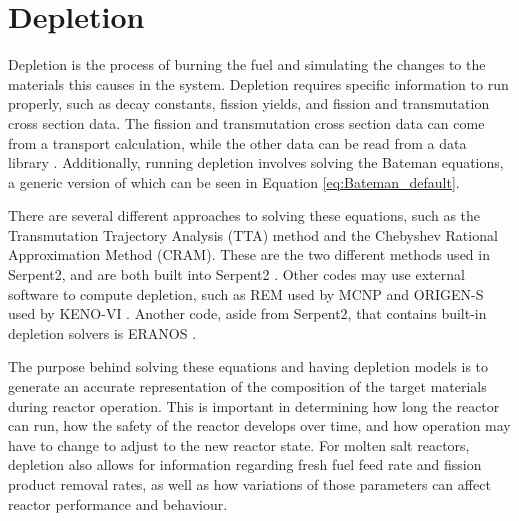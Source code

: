 \section{Depletion}

Depletion is the process of burning the fuel and simulating the changes to the materials this causes in the system. Depletion requires specific information to run properly, such as decay constants,  fission yields, and fission and transmutation cross section data. The fission and transmutation cross section data can come from a transport calculation, while the other data can be read from a data library \cite{leppanen_development_2007}. Additionally, running depletion involves solving the Bateman equations, a generic version of which can be seen in Equation \ref{eq:Bateman_default}.

There are several different approaches to solving these equations, such as the Transmutation Trajectory Analysis (TTA) method and the Chebyshev Rational Approximation Method (CRAM). These are the two different methods used in Serpent2, and are both built into Serpent2 \cite{leppanen_serpent_2015}. Other codes may use external software to compute depletion, such as REM used by MCNP and ORIGEN-S used by KENO-VI \cite{aufiero_extended_2013}. Another code, aside from Serpent2, that contains built-in depletion solvers is ERANOS \cite{aufiero_extended_2013}.

The purpose behind solving these equations and having depletion models is to generate an accurate representation of the composition of the target materials during reactor operation. This is important in determining how long the reactor can run, how the safety of the reactor develops over time, and how operation may have to change to adjust to the new reactor state. For molten salt reactors, depletion also allows for information regarding fresh fuel feed rate and fission product removal rates, as well as how variations of those parameters can affect reactor performance and behaviour.





